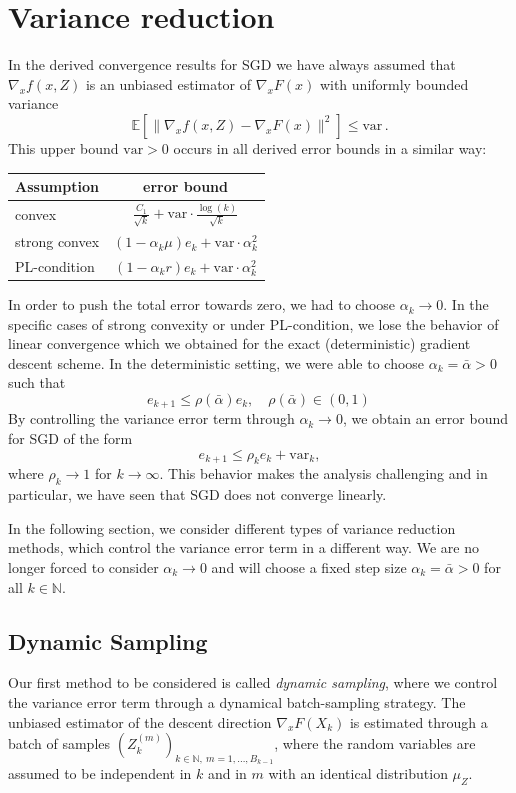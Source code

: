 \documentclass[12pt,openany]{book}
\theoremstyle{definition}
\theoremstyle{definition}
\newcommand{\E}{\mathbb{E}}
\newcommand{\N}{\mathbb{N}}
\begin{document}
\section{Variance reduction}\label{sec:SGD_varred}
In the derived convergence results for SGD we have always assumed that $\nabla_x f(x,Z)$ is an unbiased estimator of $\nabla_x F(x)$ with uniformly bounded variance 
\[ \E[\|\nabla_x f(x,Z)-\nabla_x F(x)\|^2]\le {\mathrm{var}}\,.\]
This upper bound ${\mathrm{var}}>0$ occurs in all derived error bounds in a similar way:

\begin{center}
\begin{tabular}{|l|c|}
\hline 
Assumption & error bound \\
\hline
convex & $\frac{C_1}{\sqrt{k}} + {\mathrm{var}}\cdot \frac{\log(k)}{\sqrt{k}}$\\
strong convex & $(1-\alpha_k\mu) e_k + {\mathrm{var}} \cdot \alpha_k^2$ \\
PL-condition & $(1-\alpha_k r) e_k + {\mathrm{var}}\cdot \alpha_k^2$\\
\hline
\end{tabular}
\end{center}

In order to push the total error towards zero, we had to choose $\alpha_k\to0$. In the specific cases of strong convexity or under PL-condition, we lose the behavior of linear convergence which we obtained for the exact (deterministic) gradient descent scheme. In the deterministic setting, we were able to choose $\alpha_k=\bar\alpha>0$ such that
\[e_{k+1} \le \rho(\bar\alpha) e_k,\quad \rho(\bar\alpha) \in(0,1)\,\]
By controlling the variance error term through $\alpha_k\to0$, we obtain an error bound for SGD of the form
\[e_{k+1} \le \rho_k e_k + {\mathrm{var}}_k, \]
where $\rho_k\to1$ for $k\to\infty$. This behavior makes the analysis challenging and in particular, we have seen that SGD does not converge linearly. 

In the following section, we consider different types of variance reduction methods, which control the variance error term in a different way. We are no longer forced to consider $\alpha_k\to0$ and will choose a fixed step size $\alpha_k=\bar\alpha >0$ for all $k\in\N$.

\subsection{Dynamic Sampling}
Our first method to be considered is called \textit{dynamic sampling}, where we control the variance error term through a dynamical batch-sampling strategy. The unbiased estimator of the descent direction $\nabla_x F(X_k)$ is estimated through a batch of samples $(Z_k^{(m)})_{k\in\N,\ m=1,\dots, B_{k-1}}$, where the random variables are assumed to be independent in $k$ and in $m$ with an identical distribution $\mu_Z$.
\end{document}
